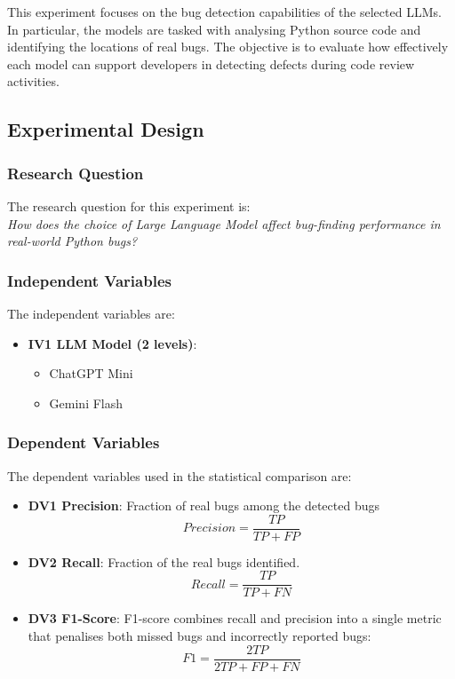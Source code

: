 \documentclass[11pt,a4paper]{article}
\begin{document}
    This experiment focuses on the bug detection capabilities of the selected LLMs. In particular, the models are tasked with analysing Python source code and identifying the locations of real bugs. The objective is to evaluate how effectively each model can support developers in detecting defects during code review activities.

    \subsection{Experimental Design}

    \subsubsection{Research Question}
    The research question for this experiment is:\\
    \textit{How does the choice of Large Language Model affect bug-finding performance in real-world Python bugs?}


    \subsubsection{Independent Variables}
    The independent variables are:
    \begin{itemize}
        \item \textbf{IV1 LLM Model (2 levels)}:
            \begin{itemize}
                \item ChatGPT Mini
                \item Gemini Flash
            \end{itemize}
    \end{itemize}

    \subsubsection{Dependent Variables}
    The dependent variables used in the statistical comparison are:
    \begin{itemize}
        \item \textbf{DV1 Precision}: Fraction of real bugs among the detected bugs \[
                Precision = \frac{TP}{TP + FP}
                \]
        \item \textbf{DV2 Recall}: Fraction of the real bugs identified. \[
                Recall = \frac{TP}{TP + FN}
                \]
        \item \textbf{DV3 F1-Score}: F1-score combines recall and precision into a single metric that penalises both missed 
    bugs and incorrectly reported bugs: \[
                F1 = \frac{2TP}{2TP + FP + FN}
                \]
    \end{itemize}
    
\end{document}
